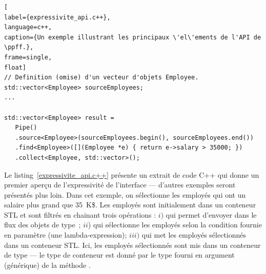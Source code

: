 



%




\begin{lstlisting}[
label={expressivite_api.c++},
language=c++,
caption={Un exemple illustrant les principaux \'el\'ements de l'API de \ppff.},
frame=single,
float]
// Definition (omise) d'un vecteur d'objets Employee.
std::vector<Employee> sourceEmployees;
...

std::vector<Employee> result = 
   Pipe()
   .source<Employee>(sourceEmployees.begin(), sourceEmployees.end())
   .find<Employee>([](Employee *e) { return e->salary > 35000; })
   .collect<Employee, std::vector>();
\end{lstlisting}




Le listing~\ref{expressivite_api.c++} pr\'esente un extrait de code C++ qui donne un premier aper\c{c}u de l'expressivit\'e de l'interface --- d'autres exemples seront pr\'esent\'es plus loin. Dans cet exemple, on s\'electionne les employ\'es qui ont un salaire plus grand que 35~K\$. Les employ\'es sont initialement dans un conteneur STL et sont filtr\'es en chainant trois op\'erations : $i)$  qui permet d'envoyer dans le flux des objets de type~; $ii$)  qui s\'electionne les employ\'es selon la condition fournie en param\`etre (une lambda-expression); $iii)$  qui met les employ\'es s\'electionn\'es dans un conteneur STL. Ici, les employ\'es s\'electionn\'es sont mis dans un conteneur de type  --- le type de conteneur est donn\'e par le type fourni en argument (g\'en\'erique) de la m\'ethode .




